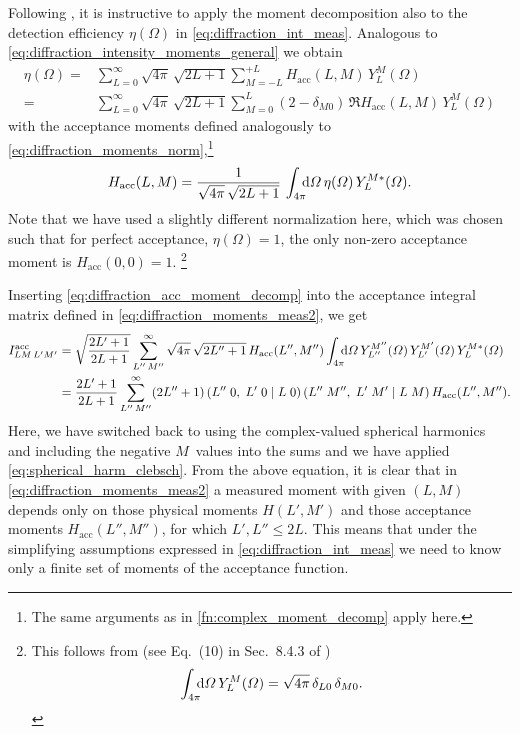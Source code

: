 Following , it is instructive to apply the
moment decomposition also to the detection efficiency $\eta(\Omega)$
in \cref{eq:diffraction_int_meas}.  Analogous to
\cref{eq:diffraction_intensity_moments_general} we obtain
\begin{align}
  \label{eq:diffraction_acc_moment_decomp}
  \eta(\Omega)
  ={}& \sum_{L = 0}^\infty \sqrt{4 \pi}\, \sqrt{2 L + 1} \sum_{M = -L}^{+L} H_\text{acc}(L, M)\, Y_L^M(\Omega)
  \\
  ={}& \sum_{L = 0}^\infty \sqrt{4 \pi}\, \sqrt{2 L + 1} \sum_{M = 0}^{L} (2 - \delta_{M 0})\, \Re{H_\text{acc}(L, M)\, Y_L^M(\Omega)}
\end{align}
with the acceptance moments defined analogously to
\cref{eq:diffraction_moments_norm},\footnote{The same arguments as in
\cref{fn:complex_moment_decomp} apply here.} \ie
\begin{equation}
  \label{eq:diffraction_acc_moment}
  H_\text{acc}(L, M)
  = \frac{1}{\sqrt{4 \pi}\, \sqrt{2 L + 1}}\, \int_{4 \pi}\!\!\! \dif{\Omega}\, \eta(\Omega)\, Y_L^{M *}(\Omega).
\end{equation}
Note that we have used a slightly different normalization here, which
was chosen such that for perfect acceptance, \ie $\eta(\Omega) = 1$,
the only non-zero acceptance moment is $H_\text{acc}(0, 0) = 1$.%
\footnote{%
  This follows from (see Eq.~(10) in Sec.~8.4.3 of
  )
  \begin{equation}
    \int_{4 \pi}\!\!\! \dif{\Omega}\, Y_L^M(\Omega)
    = \sqrt{4 \pi}\, \delta_{L 0}\, \delta_{M 0}.
  \end{equation}
}

Inserting \cref{eq:diffraction_acc_moment_decomp} into the acceptance
integral matrix defined in \cref{eq:diffraction_moments_meas2}, we get
\begin{align}
  I^\text{acc}_{L M\, L' M'}
  ={}& \sqrt{\frac{2 L' + 1}{2 L + 1}} \sum_{L''\, M''}^\infty \sqrt{4 \pi}\, \sqrt{2 L'' + 1}\, H_\text{acc}(L'', M'')
  \int_{4 \pi}\!\!\! \dif{\Omega}\, Y_{L''}^{M''}(\Omega)\, Y_{L'}^{M'}(\Omega)\, Y_L^{M *}(\Omega) \notag
  \\
  \label{eq:diffraction_acc_int_moment_decomp}
  ={}& \frac{2 L' + 1}{2 L + 1} \sum_{L''\, M''}^\infty (2 L'' + 1)\,
  \clebsch{L''}{0}{L'}{0}{L}{0}\, \clebsch{L''}{M''}{L'}{M'}{L}{M}\, H_\text{acc}(L'', M'').
\end{align}
Here, we have switched back to using the complex-valued spherical
harmonics and including the negative $M$~values into the sums and we
have applied \cref{eq:spherical_harm_clebsch}.  From the above
equation, it is clear that in \cref{eq:diffraction_moments_meas2} a
measured moment with given $(L, M)$ depends only on those physical
moments $H(L', M')$ and those acceptance moments $H_\text{acc}(L'',
M'')$, for which $L', L'' \leq 2 L$.  This means that under the
simplifying assumptions expressed in \cref{eq:diffraction_int_meas} we
need to know only a finite set of moments of the acceptance function.


